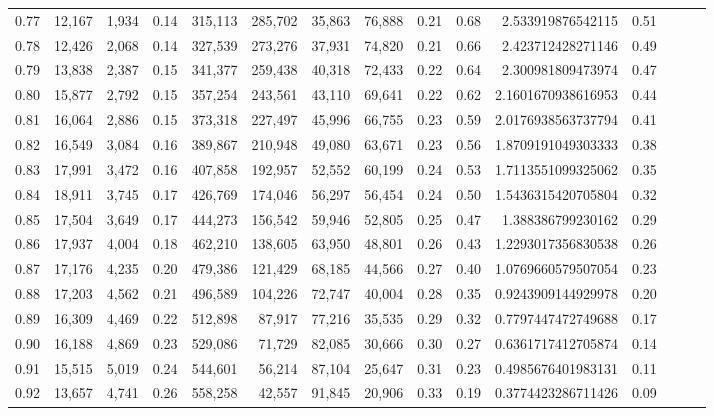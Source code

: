 \begin{tabular}{rrrrrrrrrrrrrrr}
0.77 &  12,167 &  1,934 &  0.14 &  315,113 &  285,702 &   35,863 &   76,888 &  0.21 &  0.68 &     2.533919876542115 &      0.51 \\
0.78 &  12,426 &  2,068 &  0.14 &  327,539 &  273,276 &   37,931 &   74,820 &  0.21 &  0.66 &     2.423712428271146 &      0.49 \\
0.79 &  13,838 &  2,387 &  0.15 &  341,377 &  259,438 &   40,318 &   72,433 &  0.22 &  0.64 &     2.300981809473974 &      0.47 \\
0.80 &  15,877 &  2,792 &  0.15 &  357,254 &  243,561 &   43,110 &   69,641 &  0.22 &  0.62 &    2.1601670938616953 &      0.44 \\
0.81 &  16,064 &  2,886 &  0.15 &  373,318 &  227,497 &   45,996 &   66,755 &  0.23 &  0.59 &    2.0176938563737794 &      0.41 \\
0.82 &  16,549 &  3,084 &  0.16 &  389,867 &  210,948 &   49,080 &   63,671 &  0.23 &  0.56 &    1.8709191049303333 &      0.38 \\
0.83 &  17,991 &  3,472 &  0.16 &  407,858 &  192,957 &   52,552 &   60,199 &  0.24 &  0.53 &    1.7113551099325062 &      0.35 \\
0.84 &  18,911 &  3,745 &  0.17 &  426,769 &  174,046 &   56,297 &   56,454 &  0.24 &  0.50 &    1.5436315420705804 &      0.32 \\
0.85 &  17,504 &  3,649 &  0.17 &  444,273 &  156,542 &   59,946 &   52,805 &  0.25 &  0.47 &     1.388386799230162 &      0.29 \\
0.86 &  17,937 &  4,004 &  0.18 &  462,210 &  138,605 &   63,950 &   48,801 &  0.26 &  0.43 &    1.2293017356830538 &      0.26 \\
0.87 &  17,176 &  4,235 &  0.20 &  479,386 &  121,429 &   68,185 &   44,566 &  0.27 &  0.40 &    1.0769660579507054 &      0.23 \\
0.88 &  17,203 &  4,562 &  0.21 &  496,589 &  104,226 &   72,747 &   40,004 &  0.28 &  0.35 &    0.9243909144929978 &      0.20 \\
0.89 &  16,309 &  4,469 &  0.22 &  512,898 &   87,917 &   77,216 &   35,535 &  0.29 &  0.32 &    0.7797447472749688 &      0.17 \\
0.90 &  16,188 &  4,869 &  0.23 &  529,086 &   71,729 &   82,085 &   30,666 &  0.30 &  0.27 &    0.6361717412705874 &      0.14 \\
0.91 &  15,515 &  5,019 &  0.24 &  544,601 &   56,214 &   87,104 &   25,647 &  0.31 &  0.23 &    0.4985676401983131 &      0.11 \\
0.92 &  13,657 &  4,741 &  0.26 &  558,258 &   42,557 &   91,845 &   20,906 &  0.33 &  0.19 &    0.3774423286711426 &      0.09 \\

\end{tabular}
